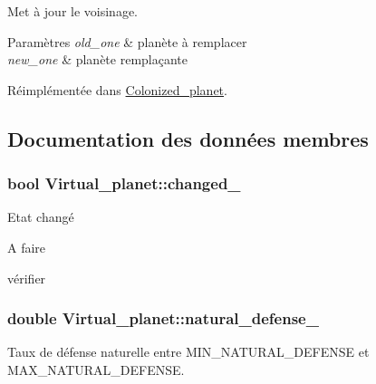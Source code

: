 Met à jour le voisinage. 


\begin{DoxyParams}{Paramètres}
{\em old\-\_\-one} & planète à remplacer \\
\hline
{\em new\-\_\-one} & planète remplaçante \\
\hline
\end{DoxyParams}


Réimplémentée dans \hyperlink{classColonized__planet_ac4f99490dc15c7715c1b476a490228a4}{Colonized\-\_\-planet}.



\subsection{Documentation des données membres}
\hypertarget{classVirtual__planet_aa5ebb40e5a4ed0a631b120749f938f35}{
\subsubsection[{changed\-\_\-}]{\setlength{\rightskip}{0pt plus 5cm}bool Virtual\-\_\-planet\-::changed\-\_\-\hspace{0.3cm}{\ttfamily [protected]}}}\label{classVirtual__planet_aa5ebb40e5a4ed0a631b120749f938f35}


Etat changé 

\begin{DoxyRefDesc}{A faire}
\item[\hyperlink{todo__todo000006}{A faire}]vérifier \end{DoxyRefDesc}
\hypertarget{classVirtual__planet_af62ede97e609fd17818af229799dbe3b}{
\subsubsection[{natural\-\_\-defense\-\_\-}]{\setlength{\rightskip}{0pt plus 5cm}double Virtual\-\_\-planet\-::natural\-\_\-defense\-\_\-\hspace{0.3cm}{\ttfamily [protected]}}}\label{classVirtual__planet_af62ede97e609fd17818af229799dbe3b}


Taux de défense naturelle entre M\-I\-N\-\_\-\-N\-A\-T\-U\-R\-A\-L\-\_\-\-D\-E\-F\-E\-N\-S\-E et M\-A\-X\-\_\-\-N\-A\-T\-U\-R\-A\-L\-\_\-\-D\-E\-F\-E\-N\-S\-E. 

